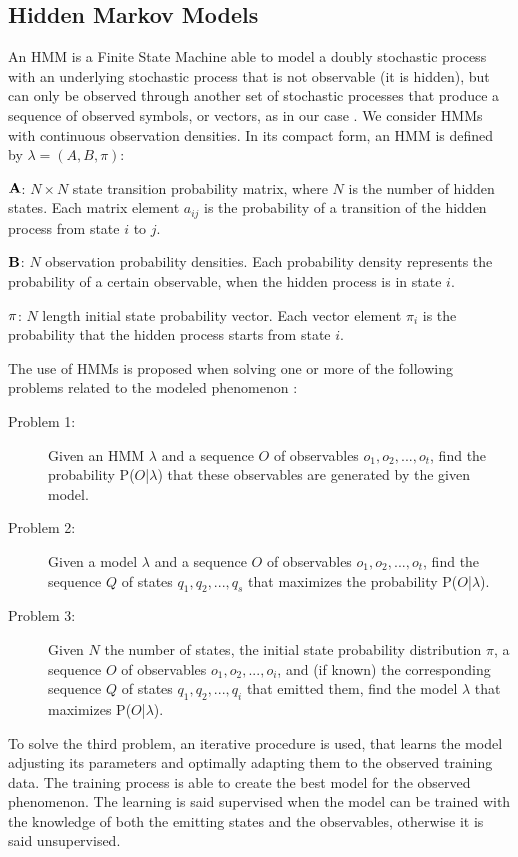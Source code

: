 \documentclass[10pt,conference,compsocconf,letterpaper]{IEEEtran}
\begin{document}
\subsection{Hidden Markov Models}\label{sec:hidden-markov-models}

An HMM is a Finite State Machine able to model a doubly stochastic
process with an underlying stochastic process that is not observable
(it is hidden), but can only be observed through another set of
stochastic processes that produce a sequence of observed symbols, or
vectors, as in our case \cite{rabiner1989tutorial}. We consider HMMs
with continuous observation densities. In its compact form, an HMM is
defined by $\lambda=(A,B,\pi)$:
\begin{description}
\item ${\bf A}$: $N\times N$ state transition probability matrix,
  where $N$ is the number of hidden states. Each matrix element
  $a_{ij}$ is the probability of a transition of the hidden process
  from state $i$ to $j$.
\item ${\bf B}$: $N$ observation probability densities. Each
  probability density represents the probability of a certain
  observable, when the hidden process is in state $i$.
\item ${\bf\pi}$: $N$ length initial state probability vector. Each
  vector element $\pi_{i}$ is the probability that the hidden process
  starts from state $i$.
\end{description}
The use of HMMs is proposed when solving one or more of the following
problems related to the modeled phenomenon \cite{rabiner1989tutorial}:
\begin{description}
\item[Problem 1:] 
Given an HMM $\lambda$ and a sequence $O$ of observables $o_{1},
  o_{2}, ..., o_{t}$, find the probability P($O$|$\lambda$) that
  these observables are generated by the given model.
\item[Problem 2:] Given a model $\lambda$ and a sequence $O$ of
  observables $o_{1}, o_{2}, ..., o_{t}$, find the sequence $Q$ of
  states $q_{1}, q_{2}, ..., q_{s}$ that maximizes the probability
  P($O$|$\lambda$).
\item[Problem 3:] Given $N$ the number of states, the initial state
  probability distribution $\pi$, a sequence $O$ of observables
  $o_{1}, o_{2}, ..., o_{i}$, and (if known) the corresponding
  sequence $Q$ of states $q_{1}, q_{2}, ..., q_{i}$ that emitted them,
  find the model $\lambda$ that maximizes P($O$|$\lambda$).
\end{description}
To solve the third problem, an iterative procedure is used, that
learns the model adjusting its parameters and optimally adapting them
to the observed training data. The training process is able to create
the best model for the observed phenomenon. The learning is said
supervised when the model can be trained with the knowledge of
both the emitting states and the observables, otherwise it is said
unsupervised.
\end{document}
